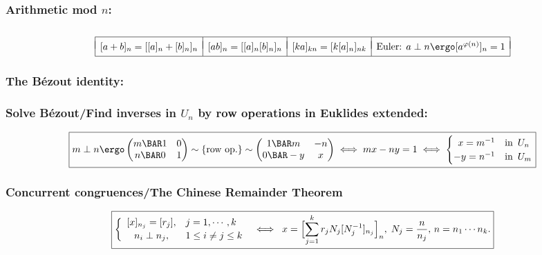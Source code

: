 \documentclass[a4paper]{article}
\begin{document}
\subsubsection*{Arithmetic mod $n$:} \vspace{-1.2em} %
\[
  \begin{array}[t]{|*{4}{l|}}
    \hline
    &&& \\[-8pt]
    [a+b]_n = [[a]_n + [b]_n]_n &
    [ab]_n = [[a]_n[b]_n]_n &
    [ka]_{kn} = [k [a]_n]_{nk} &
    \mbox{Euler: }a\perp n \ergo [a^{\varphi(n)}]_n = 1
    \\[3pt] \hline
  \end{array}
\]%

\subsubsection*{The Bézout identity: }

\subsubsection*{Solve Bézout/Find inverses in $U_n$ by row operations in Euklides extended:} %
\[
  \boxed{
  m\perp n \ergo
  \begin{pmatrix}
    m \BAR 1 & 0 \cr
    n \BAR 0 & 1 \cr
  \end{pmatrix}
  \sim \{\mbox{row op.}\} \sim
  \begin{pmatrix}
    1 \BAR m & -n \cr
    0 \BAR -y & x \cr
  \end{pmatrix}
  \iff
  mx-ny=1
  \iff
  \begin{cases}
  \hfill  x = m^{-1}   & \text{in }\, U_n \cr
   -y = n^{-1} & \text{in }\, U_m \cr
  \end{cases}
}
\]%

\subsubsection*{Concurrent congruences/The Chinese Remainder Theorem}%
\[
  \boxed{
  \left\{
  \begin{array}{ll}
    [x]_{n_j} = [r_j],& j=1,\cdots,k \\[2pt]
  \hfil n_i\perp n_j ,& 1\le i\neq j\le k
  \end{array}\right.
\;\iff\;
x = \Bigl[ \sum_{j=1}^{k} r_jN_j[N_j^{-1}]_{n_j} \Bigr]_n, \; N_j= \frac{n}{n_j}, \,
    n=n_1\cdots n_k.
  }
\]%
\end{document}
